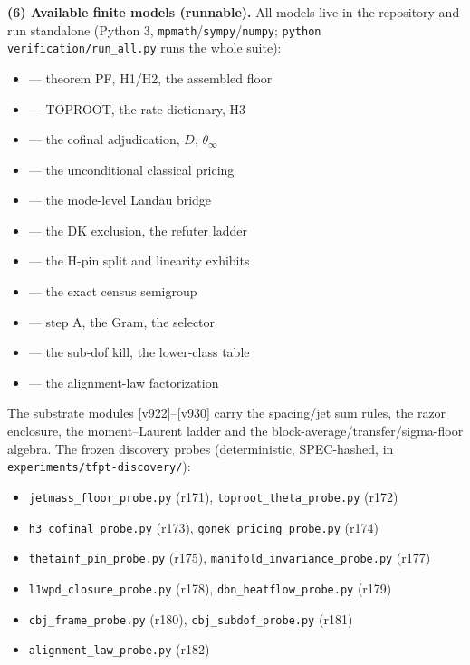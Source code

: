 \par\smallskip\noindent\textbf{(6) Available finite models (runnable).}  All models live in
the repository and run standalone (Python 3, \texttt{mpmath}/\texttt{sympy}/\texttt{numpy};
\texttt{python verification/run\_all.py} runs the whole suite):
\begin{itemize}
\item {} --- theorem PF, H1/H2, the assembled floor
\item {} --- TOPROOT, the rate dictionary, H3
\item {} --- the cofinal adjudication, $D$, $\theta_\infty$
\item {} --- the unconditional classical pricing
\item {} --- the mode-level Landau bridge
\item {} --- the DK exclusion, the refuter ladder
\item {} --- the H-pin split and linearity exhibits
\item {} --- the exact census semigroup
\item {} --- step A, the Gram, the selector
\item {} --- the sub-dof kill, the lower-class table
\item {} --- the alignment-law factorization
\end{itemize}
The substrate modules \vref{v922}--\vref{v930} carry the spacing/jet sum rules, the razor
enclosure, the moment--Laurent ladder and the block-average/transfer/sigma-floor algebra.  The
frozen discovery probes (deterministic, SPEC-hashed, in
\texttt{experiments/tfpt-discovery/}):
\begin{itemize}
\item \texttt{jetmass\_floor\_probe.py} (r171), \texttt{toproot\_theta\_probe.py} (r172)
\item \texttt{h3\_cofinal\_probe.py} (r173), \texttt{gonek\_pricing\_probe.py} (r174)
\item \texttt{thetainf\_pin\_probe.py} (r175), \texttt{manifold\_invariance\_probe.py} (r177)
\item \texttt{l1wpd\_closure\_probe.py} (r178), \texttt{dbn\_heatflow\_probe.py} (r179)
\item \texttt{cbj\_frame\_probe.py} (r180), \texttt{cbj\_subdof\_probe.py} (r181)
\item \texttt{alignment\_law\_probe.py} (r182)
\end{itemize}
